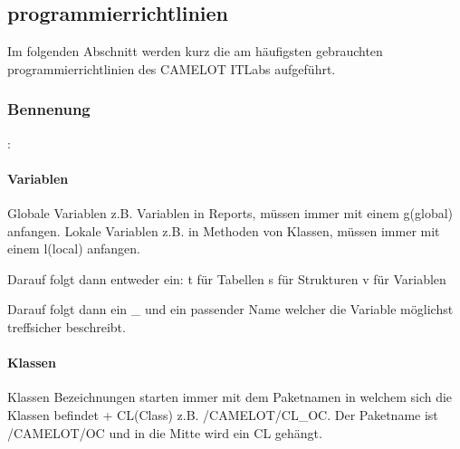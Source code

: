 \subsection{programmierrichtlinien}
\label{app:programmierrichtlinien}
Im folgenden Abschnitt werden kurz die am häufigsten gebrauchten programmierrichtlinien des CAMELOT ITLabs aufgeführt.

\subsubsection{Bennenung}:
\paragraph{Variablen}
Globale Variablen z.B. Variablen in Reports, müssen immer mit einem g(global) anfangen. 
Lokale Variablen z.B. in Methoden von Klassen, müssen immer mit einem l(local) anfangen.

Darauf folgt dann entweder ein:
	t für Tabellen
	s für Strukturen
	v für Variablen
	
Darauf folgt dann ein \_ und ein passender Name welcher die Variable möglichst treffsicher beschreibt.

\paragraph{Klassen}
Klassen Bezeichnungen starten immer mit dem Paketnamen in welchem sich die Klassen befindet + CL(Class) z.B. /CAMELOT/CL\_OC. Der Paketname ist /CAMELOT/OC und in die Mitte wird ein CL gehängt.
	

